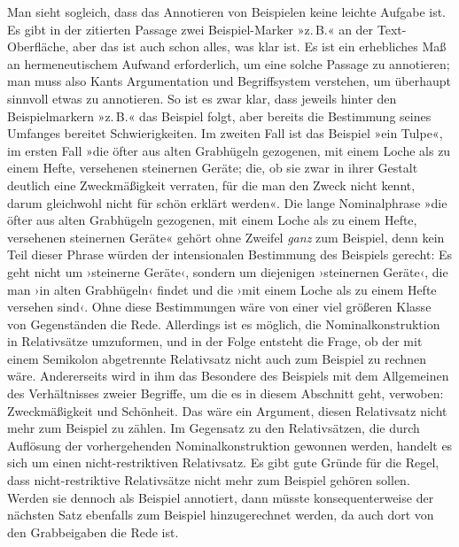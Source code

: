 \documentclass{article}
\begin{document}
Man sieht sogleich, dass das Annotieren von Beispielen keine leichte
Aufgabe ist. Es gibt in der zitierten Passage zwei Beispiel-Marker
»z.\,B.« an der Text-Oberfläche, aber das ist auch schon alles, was
klar ist. Es ist ein erhebliches Maß an hermeneutischem Aufwand
erforderlich, um eine solche Passage zu annotieren; man muss also
Kants Argumentation und Begriffsystem %
verstehen, um überhaupt sinnvoll etwas zu annotieren. So ist es zwar
klar, dass jeweils hinter den Beispielmarkern »z.\,B.« das Beispiel
folgt, aber bereits die Bestimmung seines Umfanges bereitet
Schwierigkeiten. Im zweiten Fall ist das Beispiel »ein Tulpe«, im
ersten Fall »die öfter aus alten Grabhügeln gezogenen, mit einem Loche
als zu einem Hefte, versehenen steinernen Geräte; die, ob sie zwar in
ihrer Gestalt deutlich eine Zweckmäßigkeit verraten, für die man den
Zweck nicht kennt, darum gleichwohl nicht für schön erklärt
werden«. Die lange Nominalphrase »die öfter aus alten Grabhügeln
gezogenen, mit einem Loche als zu einem Hefte, versehenen steinernen
Geräte« gehört ohne Zweifel \emph{ganz} zum Beispiel, denn kein Teil
dieser Phrase würden der intensionalen Bestimmung des Beispiels
gerecht: Es geht nicht um ›steinerne Geräte‹, sondern um diejenigen
›steinernen Geräte‹, die man ›in alten Grabhügeln‹ findet und die ›mit
einem Loche als zu einem Hefte versehen sind‹. Ohne diese Bestimmungen
wäre von einer viel größeren Klasse von Gegenständen die
Rede. Allerdings ist es möglich, die Nominalkonstruktion in
Relativsätze umzuformen, und in der Folge entsteht die Frage, ob der
mit einem Semikolon abgetrennte Relativsatz nicht auch zum Beispiel
zu rechnen wäre. Andererseits wird in ihm das Besondere des Beispiels
mit dem Allgemeinen des Verhältnisses zweier Begriffe, um die es in
diesem Abschnitt geht, verwoben: Zweckmäßigkeit und Schönheit. Das
wäre ein Argument, diesen Relativsatz nicht mehr zum Beispiel zu
zählen. Im Gegensatz zu den Relativsätzen, die durch Auflösung der
vorhergehenden Nominalkonstruktion gewonnen werden, handelt es sich um
einen nicht-restriktiven Relativsatz. Es gibt gute Gründe für die
Regel, dass nicht-restriktive Relativsätze nicht mehr zum Beispiel
gehören sollen. Werden sie dennoch als Beispiel annotiert, dann müsste
konsequenterweise der nächsten Satz ebenfalls zum Beispiel
hinzugerechnet werden, da auch dort von den Grabbeigaben die Rede ist.
\end{document}
